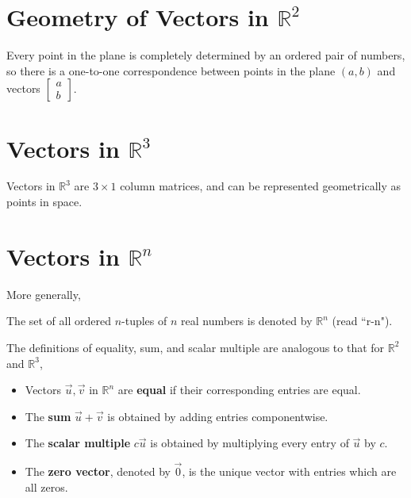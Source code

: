 \documentclass[letterpaper,12pt]{article}
\begin{document}
\section*{Geometry of Vectors in $\mathbb{R}^2$}
Every point in the plane is completely determined by an ordered pair of numbers, so there is a one-to-one correspondence between points in the plane $(a,b)$ and vectors $\begin{bmatrix} a \\ b \end{bmatrix}$.

\section*{Vectors in $\mathbb{R}^3$}
Vectors in $\mathbb{R}^3$ are $3 \times 1$ column matrices, and can be represented geometrically as points in space.

\section*{Vectors in $\mathbb{R}^n$}
More generally,

\begin{definition}
The set of all ordered $n$-tuples of $n$ real numbers is denoted by $\mathbb{R}^n$ (read ``r-n").
\end{definition}

The definitions of equality, sum, and scalar multiple are analogous to that for $\mathbb{R}^2$ and $\mathbb{R}^3$,
\begin{itemize}
    \item Vectors $\vec{u}, \vec{v}$ in $\mathbb{R}^n$ are \textbf{equal} if their corresponding entries are equal.
    \item The \textbf{sum} $\vec{u} + \vec{v}$ is obtained by adding entries componentwise.
    \item The \textbf{scalar multiple} $c \vec{u}$ is obtained by multiplying every entry of $\vec{u}$ by $c$.
    \item The \textbf{zero vector}, denoted by $\vec{0}$, is the unique vector with entries which are all zeros.
\end{itemize}
\end{document}
